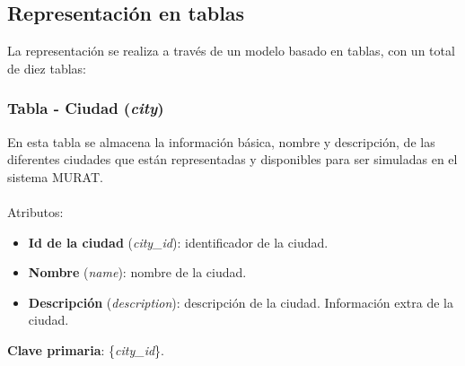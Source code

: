 \newpage
\subsection{Representación en tablas}
La representación se realiza a través de un modelo basado en tablas, con un total de diez tablas:

\subsubsection{Tabla - Ciudad (\textit{city})}
En esta tabla se almacena la información básica, nombre y descripción, de las diferentes ciudades que están representadas y disponibles para ser simuladas en el sistema MURAT. \\\\
Atributos:
\begin{itemize}
    \item \textbf{Id de la ciudad} (\textit{city\_id}): identificador de la ciudad.
    \item \textbf{Nombre} (\textit{name}): nombre de la ciudad.
    \item \textbf{Descripción} (\textit{description}): descripción de la ciudad. Información extra de la ciudad.
\end{itemize}
\textbf{Clave primaria}: \{\textit{city\_id}\}. \\

